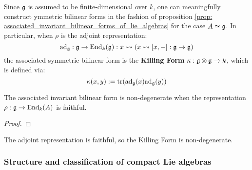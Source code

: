                     \begin{example} \label{example: the_killing_form}
                        Since $\mathfrak{g}$ is assumed to be finite-dimensional over $k$, one can meaningfully construct ymmetric bilinear forms in the fashion of proposition \ref{prop: associated_invariant_bilinear_forms_of_lie_algebras} for the case $A \simeq \mathfrak{g}$. In particular, when $\rho$ is the adjoint representation:
                            $$\mathrm{ad}_{\mathfrak{g}}: \mathfrak{g} \to \mathrm{End}_k(\mathfrak{g}): x \leadsto \left(x \leadsto [x, -]: \mathfrak{g} \to \mathfrak{g}\right)$$
                        the associated symmetric bilinear form is the \textbf{Killing Form} $\kappa: \g \tensor \g \to k$, which is defined via:
                            $$\kappa(x, y) := \operatorname{tr}(\mathrm{ad}_{\mathfrak{g}}(x) \mathrm{ad}_{\mathfrak{g}}(y))$$
                    \end{example}
                    
                    \begin{theorem} \label{theorem: nondegeneracy_of_associated_invariant_bilinear_forms_of_lie_algebras}
                        The associated invariant bilinear form is non-degenerate when the representation $\rho: \mathfrak{g} \to \mathrm{End}_k(A)$ is faithful.
                    \end{theorem}
                        \begin{proof}
                            
                        \end{proof}
                    \begin{corollary}
                        The adjoint representation is faithful, so the Killing Form is non-degenerate. 
                    \end{corollary}
                    
            \subsubsection{Structure and classification of compact Lie algebras}
    
